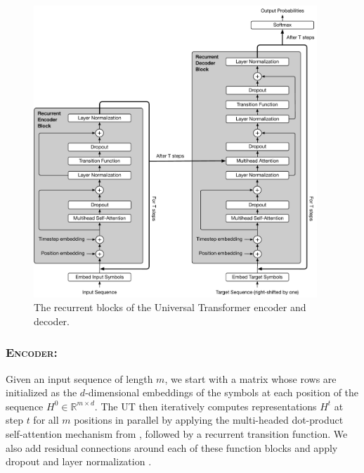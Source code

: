 \begin{figure}[t]
 \centering
 \includegraphics[width=0.95\textwidth]{04-part-03/chapter-06/figs_and_tables/fig_universal-transformer-complete.pdf}
 \caption{The recurrent blocks of the Universal Transformer encoder and decoder.}
 \label{fig:universal-transformer-complete}
\end{figure}

\subsubsection{\textsc{Encoder:}}
Given an input sequence of length $m$, we start with a matrix whose rows are initialized as the $d$-dimensional embeddings of the symbols at each position of the sequence $H^0 \in \mathbb{R}^{m \times d}$. The UT then iteratively computes representations $H^t$ at step $t$ for all $m$ positions in parallel by applying the multi-headed dot-product self-attention mechanism from \cite{transformer}, followed by a recurrent transition function. We also add residual connections around each of these function blocks and apply dropout and layer normalization \citep{srivastava2014dropout, layernorm2016}.

